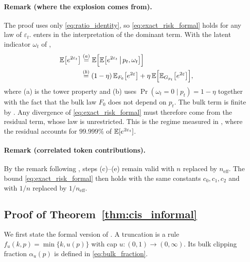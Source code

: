 \paragraph{Remark (where the explosion comes from).}
The proof uses only \eqref{eq:ratio_identity}, so \eqref{eq:exact_risk_formal}
holds for any law of $\varepsilon_t$.  enters in
the interpretation of the dominant term. With the latent indicator
$\omega_t$ of ,
\begin{align*}
\mathbb{E}\big[e^{2\varepsilon_t}\big]
&\overset{(a)}{=} \mathbb{E}\Big[\mathbb{E}\big[e^{2\varepsilon_t}\,\big|\,p_t,\omega_t\big]\Big]\\
&\overset{(b)}{=} (1-\eta)\,\mathbb{E}_{F_0}\big[e^{2\varepsilon}\big]
+\eta\,\mathbb{E}\Big[\mathbb{E}_{G_{p_t}}\big[e^{2\varepsilon}\big]\Big],
\end{align*}
where (a) is the tower property and (b) uses $\Pr(\omega_t=0\mid p_t)=1-\eta$
together with the fact that the bulk law $F_0$ does not depend on $p_t$. The
bulk term is finite by . Any divergence of
\eqref{eq:exact_risk_formal} must therefore come from the residual term, whose
law is unrestricted. This is the regime measured in , where the
residual accounts for $99.999\%$ of $\mathbb{E}[e^{2\varepsilon_t}]$.

\paragraph{Remark (correlated token contributions).}
By the remark following , steps (c)--(e) remain valid
with $n$ replaced by $n_{\mathrm{eff}}$. The bound
\eqref{eq:exact_risk_formal} then holds with the same constants
$c_0,c_1,c_2$ and with $1/n$ replaced by $1/n_{\mathrm{eff}}$.

\subsection{Proof of Theorem~\ref{thm:cis_informal}}
\label{app:proof_cis}

We first state the formal version of . A truncation is
a rule $f_u(k,p)=\min\{k,u(p)\}$ with cap $u:(0,1)\to(0,\infty)$. Its bulk
clipping fraction $\alpha_u(p)$ is defined in \eqref{eq:bulk_fraction}.

